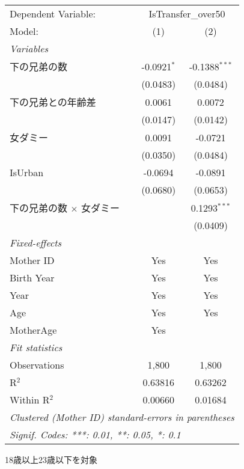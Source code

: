 \documentclass{article}
\begin{document}
\begingroup
\centering
\begin{threeparttable}[b]
   \begin{tabular}{lcc}
      \tabularnewline \midrule \midrule
      Dependent Variable: & \multicolumn{2}{c}{IsTransfer\_over50}\\
      Model:                          & (1)           & (2)\\  
      \midrule
      \emph{Variables}\\
      下の兄弟の数                    & -0.0921$^{*}$ & -0.1388$^{***}$\\   
                                      & (0.0483)      & (0.0484)\\   
      下の兄弟との年齢差              & 0.0061        & 0.0072\\   
                                      & (0.0147)      & (0.0142)\\   
      女ダミー                        & 0.0091        & -0.0721\\   
                                      & (0.0350)      & (0.0484)\\   
      IsUrban                         & -0.0694       & -0.0891\\   
                                      & (0.0680)      & (0.0653)\\   
      下の兄弟の数 $\times$ 女ダミー  &               & 0.1293$^{***}$\\   
                                      &               & (0.0409)\\   
      \midrule
      \emph{Fixed-effects}\\
      Mother ID                       & Yes           & Yes\\  
      Birth Year                      & Yes           & Yes\\  
      Year                            & Yes           & Yes\\  
      Age                             & Yes           & Yes\\  
      MotherAge                       & Yes           & \\  
      \midrule
      \emph{Fit statistics}\\
      Observations                    & 1,800         & 1,800\\  
      R$^2$                           & 0.63816       & 0.63262\\  
      Within R$^2$                    & 0.00660       & 0.01684\\  
      \midrule \midrule
      \multicolumn{3}{l}{\emph{Clustered (Mother ID) standard-errors in parentheses}}\\
      \multicolumn{3}{l}{\emph{Signif. Codes: ***: 0.01, **: 0.05, *: 0.1}}\\
   \end{tabular}
   
   \begin{tablenotes}\item 18歳以上23歳以下を対象
   \end{tablenotes}
\end{threeparttable}
\par\endgroup
\end{document}
